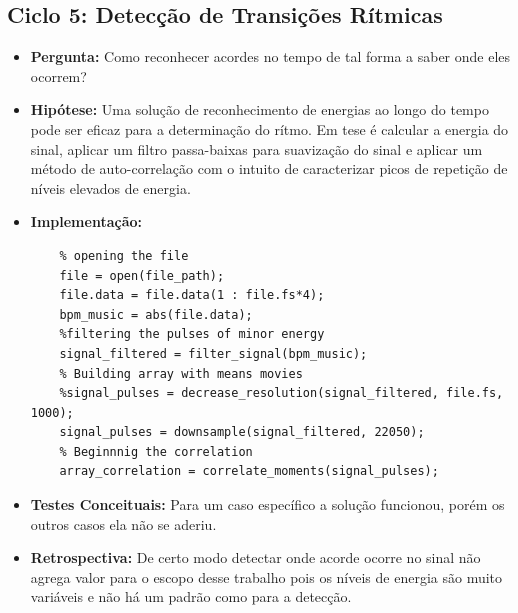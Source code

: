 \subsection{Ciclo 5: Detecção de Transições Rítmicas}
\label{subsec:ciclo_5}
\begin{itemize}
\item \textbf{Pergunta:} Como reconhecer acordes no tempo de tal forma a saber onde eles ocorrem?
\item \textbf{Hipótese:} Uma solução de reconhecimento de energias ao longo do tempo pode ser
eficaz para a determinação do rítmo. Em tese é calcular a energia do sinal, aplicar
um filtro passa-baixas para suavização do sinal e aplicar um método de auto-correlação com o intuito de caracterizar picos de repetição de níveis elevados de energia.
\item \textbf{Implementação:} 
\begin{lstlisting}
    % opening the file
    file = open(file_path);
    file.data = file.data(1 : file.fs*4);
    bpm_music = abs(file.data);
    %filtering the pulses of minor energy
    signal_filtered = filter_signal(bpm_music);
    % Building array with means movies
    %signal_pulses = decrease_resolution(signal_filtered, file.fs, 1000);
    signal_pulses = downsample(signal_filtered, 22050);
    % Beginnnig the correlation
    array_correlation = correlate_moments(signal_pulses);

\end{lstlisting}
\item \textbf{Testes Conceituais:} Para um caso específico a solução funcionou, porém os outros casos ela não se aderiu.    
\item \textbf{Retrospectiva:} De certo modo detectar onde acorde ocorre no sinal não agrega valor para o escopo desse trabalho pois os níveis de energia são muito variáveis e não há um padrão como para a detecção.
\end{itemize} 

